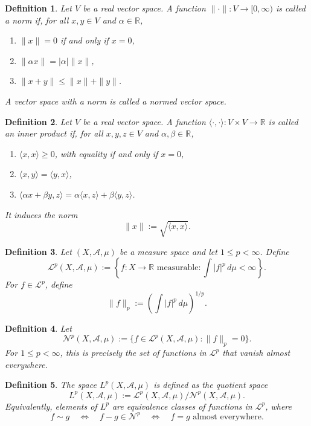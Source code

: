 \documentclass[12pt]{article}
\newtheorem{definition}{Definition}
\begin{document}
\begin{definition}
Let $V$ be a real vector space. A function $\|\cdot\|:V\to[0,\infty)$ is called
a \emph{norm} if, for all $x,y\in V$ and $\alpha\in\mathbb{R}$,
\begin{enumerate}[label=(\alph*)]
    \item $\|x\|=0$ if and only if $x=0$,
    \item $\|\alpha x\|=|\alpha|\|x\|$,
    \item $\|x+y\|\le \|x\|+\|y\|$.
\end{enumerate}
A vector space with a norm is called a \emph{normed vector space}.
\end{definition}

\begin{definition}
Let $V$ be a real vector space. A function
$\langle \cdot,\cdot\rangle:V\times V\to\mathbb{R}$ is called an
\emph{inner product} if, for all $x,y,z\in V$ and $\alpha,\beta\in\mathbb{R}$,
\begin{enumerate}[label=(\alph*)]
    \item $\langle x,x\rangle\ge 0$, with equality if and only if $x=0$,
    \item $\langle x,y\rangle=\langle y,x\rangle$,
    \item $\langle \alpha x+\beta y,z\rangle
    =\alpha\langle x,z\rangle+\beta\langle y,z\rangle$.
\end{enumerate}
It induces the norm
\[
\|x\|:=\sqrt{\langle x,x\rangle}.
\]
\end{definition}

\begin{definition}
Let $(X,\mathcal{A},\mu)$ be a measure space and let $1\le p<\infty$. Define
\[
\mathcal{L}^p(X,\mathcal{A},\mu)
:=
\left\{
f:X\to\mathbb{R} \text{ measurable} :
\int |f|^p\,d\mu<\infty
\right\}.
\]
For $f\in\mathcal{L}^p$, define
\[
\|f\|_p
:=
\left(\int |f|^p\,d\mu\right)^{1/p}.
\]
\end{definition}

\begin{definition}
Let
\[
\mathcal{N}^p(X,\mathcal{A},\mu)
:=
\{f\in\mathcal{L}^p(X,\mathcal{A},\mu):\|f\|_p=0\}.
\]
For $1\le p<\infty$, this is precisely the set of functions in
$\mathcal{L}^p$ that vanish almost everywhere.
\end{definition}

\begin{definition}
The space $L^p(X,\mathcal{A},\mu)$ is defined as the quotient space
\[
L^p(X,\mathcal{A},\mu)
:=
\mathcal{L}^p(X,\mathcal{A},\mu)/\mathcal{N}^p(X,\mathcal{A},\mu).
\]
Equivalently, elements of $L^p$ are equivalence classes of functions in
$\mathcal{L}^p$, where
\[
f\sim g
\quad\Longleftrightarrow\quad
f-g\in \mathcal{N}^p
\quad\Longleftrightarrow\quad
f=g \text{ almost everywhere}.
\]
\end{definition}
\end{document}
